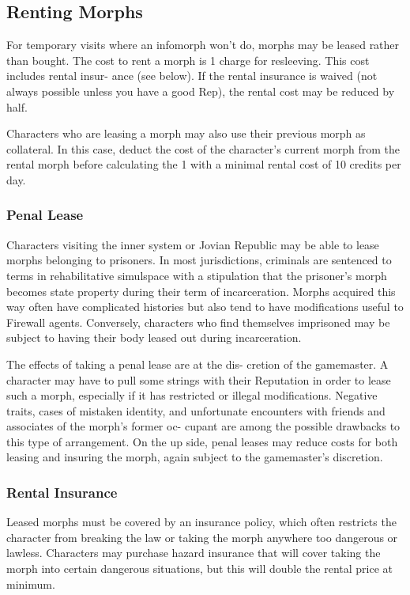 \subsection{Renting Morphs}

For temporary visits where an infomorph won't do, 
morphs may be leased rather than bought. The cost 
to rent a morph is 1%
charge for resleeving. This cost includes rental insur-
ance (see below). If the rental insurance is waived 
(not always possible unless you have a good Rep), the 
rental cost may be reduced by half.

Characters who are leasing a morph may also use 
their previous morph as collateral. In this case, deduct 
the cost of the character's current morph from the 
rental morph before calculating the 1%
with a minimal rental cost of 10 credits per day.

\subsubsection{Penal Lease}

Characters visiting the inner system or Jovian 
Republic may be able to lease morphs belonging 
to prisoners. In most jurisdictions, criminals are 
sentenced to terms in rehabilitative simulspace with 
a stipulation that the prisoner's morph becomes 
state property during their term of incarceration. 
Morphs acquired this way often have complicated 
histories but also tend to have modifications useful 
to Firewall agents. Conversely, characters who find 
themselves imprisoned may be subject to having 
their body leased out during incarceration.

The effects of taking a penal lease are at the dis-
cretion of the gamemaster. A character may have 
to pull some strings with their Reputation in order 
to lease such a morph, especially if it has restricted 
or illegal modifications. Negative traits, cases of 
mistaken identity, and unfortunate encounters with 
friends and associates of the morph's former oc-
cupant are among the possible drawbacks to this 
type of arrangement. On the up side, penal leases 
may reduce costs for both leasing and insuring the 
morph, again subject to the gamemaster's discretion.

\subsubsection{Rental Insurance}

Leased morphs must be covered by an insurance 
policy, which often restricts the character from 
breaking the law or taking the morph anywhere 
too dangerous or lawless. Characters may purchase 
hazard insurance that will cover taking the morph 
into certain dangerous situations, but this will 
double the rental price at minimum.

